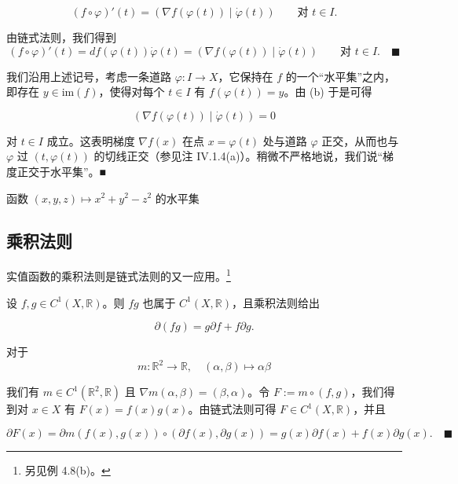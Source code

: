 \begin{example}
\begin{items}
\[
(f \circ \varphi)'(t) = (\nabla f(\varphi(t)) \mid \dot\varphi(t)) \qquad \text{对 } t \in I .
\]

\proofhead
由链式法则，我们得到
\[
(f \circ \varphi)'(t) = df(\varphi(t))\dot\varphi(t) = (\nabla f(\varphi(t)) \mid \dot\varphi(t)) \qquad \text{对 } t \in I .\quad\blacksquare
\]
\item

我们沿用上述记号，考虑一条道路 $ \varphi : I \to X $，它保持在 $ f $ 的一个“水平集”之内，即存在 $ y \in \mathrm{im}(f) $，使得对每个 $ t \in I $ 有 $ f(\varphi(t)) = y $。由 (b) 于是可得

\[
(\nabla f(\varphi(t)) \mid \dot\varphi(t)) = 0
\]

对 $ t \in I $ 成立。这表明梯度 $ \nabla f(x) $ 在点 $ x = \varphi(t) $ 处与道路 $ \varphi $ 正交，从而也与 $ \varphi $ 过 $ (t, \varphi(t)) $ 的切线正交（参见注 IV.1.4(a)）。稍微不严格地说，我们说“梯度正交于水平集”。\nobreak\hspace{0.35em}■

\end{items}


函数 $ (x, y, z) \mapsto x^2 + y^2 - z^2 $ 的水平集

\end{example}

\subsection*{乘积法则}

实值函数的乘积法则是链式法则的又一应用。\footnote{另见例 4.8(b)。}

\begin{proposition}

设 $ f, g \in C^1(X, \mathbb{R}) $。则 $ fg $ 也属于 $ C^1(X, \mathbb{R}) $，且乘积法则给出

\begin{equation}
\partial(fg) = g\partial f + f\partial g .\tag{3.4}
\end{equation}

\proofhead
对于
\[
m : \mathbb{R}^2 \to \mathbb{R} , \quad (\alpha, \beta) \mapsto \alpha\beta
\]

我们有 $ m \in C^1(\mathbb{R}^2, \mathbb{R}) $ 且 $ \nabla m(\alpha, \beta) = (\beta, \alpha) $。令 $ F := m \circ (f, g) $，我们得到对 $ x \in X $ 有 $ F(x) = f(x)g(x) $。由链式法则可得 $ F \in C^1(X, \mathbb{R}) $，并且

\[
\partial F(x) = \partial m(f(x), g(x)) \circ (\partial f(x), \partial g(x)) = g(x)\partial f(x) + f(x)\partial g(x) .\quad\blacksquare
\]
\end{proposition}

